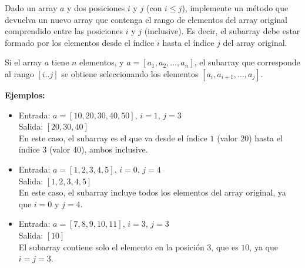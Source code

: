 Dado un array \(a\) y dos posiciones \(i\) y \(j\) (con \(i \leq j\)), implemente un método que devuelva un nuevo array que contenga el rango de elementos del array original comprendido entre las posiciones \(i\) y \(j\) (inclusive). Es decir, el subarray debe estar formado por los elementos desde el índice \(i\) hasta el índice \(j\) del array original.

Si el array \(a\) tiene \(n\) elementos, y \(a = [a_1, a_2, \dots, a_n]\), el subarray que corresponde al rango \([i..j]\) se obtiene seleccionando los elementos \([a_i, a_{i+1}, \dots, a_j]\).

\textbf{Ejemplos:}
\begin{itemize}
    \item Entrada: \(a = [10, 20, 30, 40, 50]\), \(i = 1\), \(j = 3\) \\
    Salida: \([20, 30, 40]\) \\
    En este caso, el subarray es el que va desde el índice \(1\) (valor \(20\)) hasta el índice \(3\) (valor \(40\)), ambos inclusive.

    \item Entrada: \(a = [1, 2, 3, 4, 5]\), \(i = 0\), \(j = 4\) \\
    Salida: \([1, 2, 3, 4, 5]\) \\
    En este caso, el subarray incluye todos los elementos del array original, ya que \(i = 0\) y \(j = 4\).
    
    \item Entrada: \(a = [7, 8, 9, 10, 11]\), \(i = 3\), \(j = 3\) \\
    Salida: \([10]\) \\
    El subarray contiene solo el elemento en la posición \(3\), que es \(10\), ya que \(i = j = 3\).
\end{itemize}